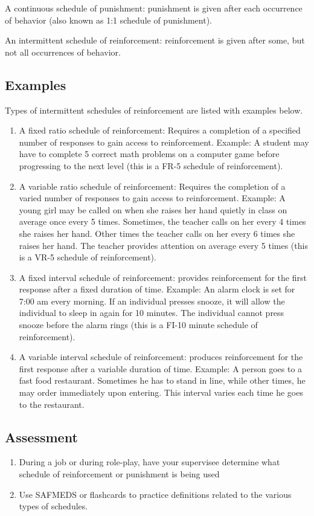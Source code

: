 A continuous schedule of punishment: punishment is given after each occurrence of behavior (also known as 1:1 schedule of punishment).
 
An intermittent schedule of reinforcement: reinforcement is given after some, but not all occurrences of behavior.

\subsection{Examples}
Types of intermittent schedules of reinforcement are listed with examples below.
\begin{enumerate}
\item A fixed ratio schedule of reinforcement: Requires a completion of a specified number of responses to gain access to reinforcement. Example: A student may have to complete 5 correct math problems on a computer game before progressing to the next level (this is a FR-5 schedule of reinforcement).
\item A variable ratio schedule of reinforcement: Requires the completion of a varied number of responses to gain access to reinforcement. Example: A young girl may be called on when she raises her hand quietly in class on average once every 5 times. Sometimes, the teacher calls on her every 4 times she raises her hand. Other times the teacher calls on her every 6 times she raises her hand. The teacher provides attention on average every 5 times (this is a VR-5 schedule of reinforcement).
\item A fixed interval schedule of reinforcement: provides reinforcement for the first response after a fixed duration of time. Example: An alarm clock is set for 7:00 am every morning. If an individual presses snooze, it will allow the individual to sleep in again for 10 minutes. The individual cannot press snooze before the alarm rings (this is a FI-10 minute schedule of reinforcement).
\item A variable interval schedule of reinforcement: produces reinforcement for the first response after a variable duration of time. Example: A person goes to a fast food restaurant. Sometimes he has to stand in line, while other times, he may order immediately upon entering. This interval varies each time he goes to the restaurant. 
\end{enumerate}
%
\subsection{Assessment}
\begin{enumerate}
\item During a job or during role-play, have your supervisee determine what schedule of reinforcement or punishment is being used
\item Use SAFMEDS or flashcards to practice definitions related to the various types of schedules.
%
\end{enumerate}
%
